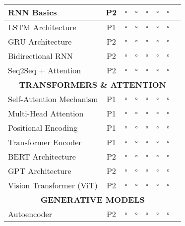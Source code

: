 \documentclass[10pt]{article}
\begin{document}
\begin{center}
\begin{longtable}{|p{3.5cm}|c|c|c|c|c|c|p{3cm}|}
RNN Basics & P2 & $\square$ & $\square$ & $\square$ & $\square$ & $\square$ & \\
\hline

LSTM Architecture & P1 & $\square$ & $\square$ & $\square$ & $\square$ & $\square$ & \\
\hline

GRU Architecture & P2 & $\square$ & $\square$ & $\square$ & $\square$ & $\square$ & \\
\hline

Bidirectional RNN & P2 & $\square$ & $\square$ & $\square$ & $\square$ & $\square$ & \\
\hline

Seq2Seq + Attention & P2 & $\square$ & $\square$ & $\square$ & $\square$ & $\square$ & \\
\hline

\multicolumn{8}{|c|}{\cellcolor{gray!30}\textbf{TRANSFORMERS \& ATTENTION}} \\
\hline

Self-Attention Mechanism & P1 & $\square$ & $\square$ & $\square$ & $\square$ & $\square$ & \\
\hline

Multi-Head Attention & P1 & $\square$ & $\square$ & $\square$ & $\square$ & $\square$ & \\
\hline

Positional Encoding & P1 & $\square$ & $\square$ & $\square$ & $\square$ & $\square$ & \\
\hline

Transformer Encoder & P1 & $\square$ & $\square$ & $\square$ & $\square$ & $\square$ & \\
\hline

BERT Architecture & P2 & $\square$ & $\square$ & $\square$ & $\square$ & $\square$ & \\
\hline

GPT Architecture & P2 & $\square$ & $\square$ & $\square$ & $\square$ & $\square$ & \\
\hline

Vision Transformer (ViT) & P2 & $\square$ & $\square$ & $\square$ & $\square$ & $\square$ & \\
\hline

\multicolumn{8}{|c|}{\cellcolor{gray!30}\textbf{GENERATIVE MODELS}} \\
\hline

Autoencoder & P2 & $\square$ & $\square$ & $\square$ & $\square$ & $\square$ & \\
\hline


\end{longtable}
\end{center}
\end{document}
